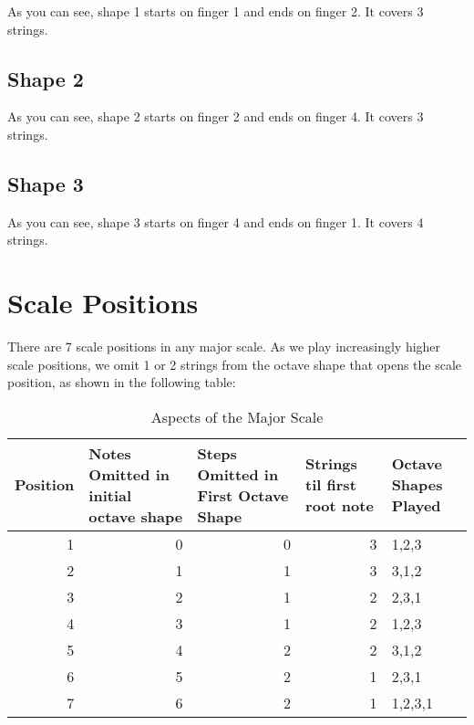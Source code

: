 \documentclass[12pt]{report}
\begin{document}
As you can see, shape 1 starts on finger 1 and ends on finger 2. It
covers 3 strings.

\subsection{Shape 2}
\begin{sideways}
  \def\numfrets{10}


\end{sideways}

As you can see, shape 2 starts on finger 2 and ends on finger 4. It
covers 3 strings.

\subsection{Shape 3}
\begin{sideways}

  \def\numfrets{16}

\end{sideways}

As you can see, shape 3 starts on finger 4 and ends on finger 1. It
covers 4 strings. 

\section{Scale Positions}

There are 7 scale positions in any major scale. As we play increasingly
higher scale positions, we omit 1 or 2 strings from the octave shape
that opens the scale position, as shown in the following table:
\begin{table}[htbp]
\caption{Aspects of the Major Scale}
\begin{tabular}{|r|r|r|r|l|}
\hline
\multicolumn{1}{|l|}{Position} & \multicolumn{1}{l|}{Notes Omitted in initial octave shape} & \multicolumn{1}{l|}{Steps Omitted in First Octave Shape} & \multicolumn{1}{l|}{Strings til first root note} & Octave Shapes Played \\ \hline
1 & 0 & 0 & 3 & 1,2,3 \\ \hline
2 & 1 & 1 & 3 & 3,1,2 \\ \hline
3 & 2 & 1 & 2 & 2,3,1 \\ \hline
4 & 3 & 1 & 2 & 1,2,3 \\ \hline
5 & 4 & 2 & 2 & 3,1,2 \\ \hline
6 & 5 & 2 & 1 & 2,3,1 \\ \hline
7 & 6 & 2 & 1 & 1,2,3,1 \\ \hline
\end{tabular}
\label{}
\end{table}
\end{document}

